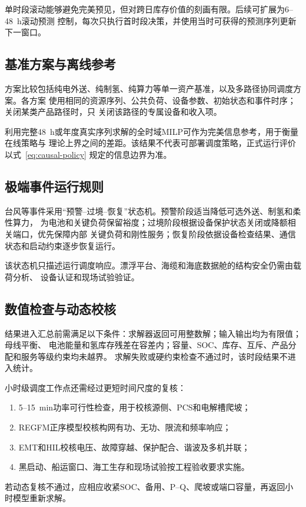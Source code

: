 单时段滚动能够避免完美预见，但对跨日库存价值的刻画有限。后续可扩展为6--48~h滚动预测
控制，每次只执行首时段决策，并使用当时可获得的预测序列更新下一窗口。

\subsection{基准方案与离线参考}

方案比较包括纯电外送、纯制氢、纯算力等单一资产基准，以及多路径协同调度方案。各方案
使用相同的资源序列、公共负荷、设备参数、初始状态和事件时序；关闭某类产品路径时，只
关闭该路径的专属设备和收入项。

利用完整48~h或年度真实序列求解的全时域MILP可作为完美信息参考，用于衡量在线策略与
理论上界之间的差距。该结果不代表可部署调度策略，正式运行评价以式~\eqref{eq:causal-policy}
规定的信息边界为准。

\subsection{极端事件运行规则}

台风等事件采用“预警--过境--恢复”状态机。预警阶段适当降低可选外送、制氢和柔性算力，
为电池和关键负荷保留裕度；过境阶段根据设备保护状态关闭或降额相关端口，优先保障内部
关键负荷和刚性服务；恢复阶段依据设备检查结果、通信状态和启动约束逐步恢复运行。

该状态机只描述运行调度响应。漂浮平台、海缆和海底数据舱的结构安全仍需由载荷分析、
设备认证和现场试验验证。

\subsection{数值检查与动态校核}

结果进入汇总前需满足以下条件：求解器返回可用整数解；输入输出均为有限值；母线平衡、
电池能量和氢库存残差在容差内；容量、SOC、库存、互斥、产品分配和服务等级约束均未越界。
求解失败或硬约束检查不通过时，该时段结果不进入统计。

小时级调度工作点还需经过更短时间尺度的复核：
\begin{enumerate}[label=(\arabic*)]
\item 5--15~min功率可行性检查，用于校核源侧、PCS和电解槽爬坡；
\item REGFM正序模型校核构网有功、无功、限流和频率响应\cite{regfm-b1}；
\item EMT和HIL校核电压、故障穿越、保护配合、谐波及多机并联；
\item 黑启动、船运窗口、海工生存和现场试验按工程验收要求实施。
\end{enumerate}
若动态复核不通过，应相应收紧SOC、备用、P--Q、爬坡或端口容量，再返回小时模型重新求解。
